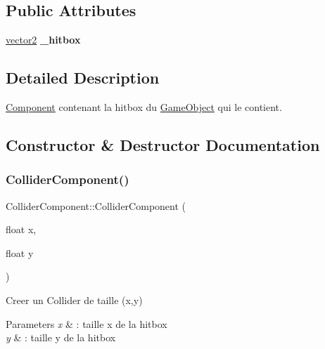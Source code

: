\subsection*{Public Attributes}
\begin{DoxyCompactItemize}
\item 
\hypertarget{class_collider_component_a9d1e72e0e45b58f19d644aae2fd2ee4c}{}\label{class_collider_component_a9d1e72e0e45b58f19d644aae2fd2ee4c} 
\hyperlink{structvector2}{vector2} {\bfseries \+\_\+hitbox}
\end{DoxyCompactItemize}


\subsection{Detailed Description}
\hyperlink{class_component}{Component} contenant la hitbox du \hyperlink{class_game_object}{Game\+Object} qui le contient. 

\subsection{Constructor \& Destructor Documentation}
\hypertarget{class_collider_component_a879db27a552a7dd9642a8fc6e36616cd}{}\label{class_collider_component_a879db27a552a7dd9642a8fc6e36616cd} 
\subsubsection{\texorpdfstring{Collider\+Component()}{ColliderComponent()}\hspace{0.1cm}{\footnotesize\ttfamily [1/2]}}
{\footnotesize\ttfamily Collider\+Component\+::\+Collider\+Component (\begin{DoxyParamCaption}\item[{float}]{x,  }\item[{float}]{y }\end{DoxyParamCaption})\hspace{0.3cm}{\ttfamily [inline]}}



Creer un Collider de taille (x,y) 


\begin{DoxyParams}{Parameters}
{\em x} & \+: taille x de la hitbox \\
\hline
{\em y} & \+: taille y de la hitbox \\
\hline
\end{DoxyParams}
\hypertarget{class_collider_component_a952c8989df7be45036d88ff5c5ab3e0a}{}\label{class_collider_component_a952c8989df7be45036d88ff5c5ab3e0a} 
